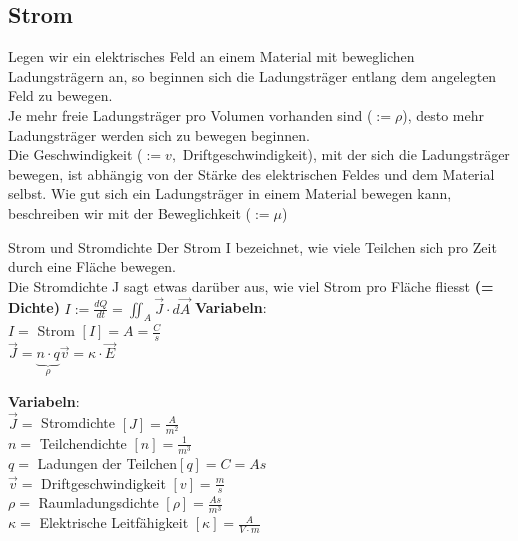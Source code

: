 %
%
%
%
%

					\subsection{Strom}
					\label{chap:Style}
					Legen wir ein elektrisches Feld an einem Material mit beweglichen Ladungsträgern an,
					so beginnen sich die Ladungsträger entlang dem angelegten Feld zu bewegen. \\
					Je mehr freie Ladungsträger pro Volumen vorhanden sind ($:= \rho$), desto mehr Ladungsträger werden sich zu bewegen beginnen. \\
					Die Geschwindigkeit ($:= v,$ Driftgeschwindigkeit), mit der sich die Ladungsträger bewegen, ist abhängig von der Stärke des elektrischen Feldes und
					dem Material selbst. Wie gut sich ein Ladungsträger in einem Material bewegen kann, beschreiben wir mit der Beweglichkeit ($:= \mu$)


					 {Strom und Stromdichte}
					\beginip
					Der Strom I bezeichnet, wie viele Teilchen sich pro Zeit durch eine Fläche bewegen. \\
					Die Stromdichte J sagt etwas darüber aus, wie viel Strom pro Fläche fliesst \textbf{(= Dichte)}
					\formulaBegin
						$\displaystyle I := \frac{dQ}{dt} = \iint_A \vec{J} \cdot d\vec{A}$
					\formulaEnd
					\textbf{Variabeln}: \\
					$ I = $ Strom $ [I] = A = \frac{C}{s}$ \\

					\formulaBegin
					$\displaystyle \vec{J} = \underbrace{n\cdot q}_{\rho} \vec{v} = \kappa \cdot \vec{E}$
					\formulaEnd

					\textbf{Variabeln}: \\
					$ \vec{J} = $ Stromdichte $ [J] = \frac{A}{m^2}$ \\
					$ n =$ Teilchendichte $ [n] = \frac{1}{m^3}$ \\
					$ q =$ Ladungen der Teilchen$ [q] = C = As$ \\
					$ \vec{v} = $ Driftgeschwindigkeit $ [v] = \frac{m}{s}$ \\
					$ \rho = $ Raumladungsdichte $ [\rho] = \frac{As}{m^3}$ \\
					$ \kappa = $ Elektrische Leitfähigkeit $ [\kappa] = \frac{A}{V\cdot m}$
					\iend

